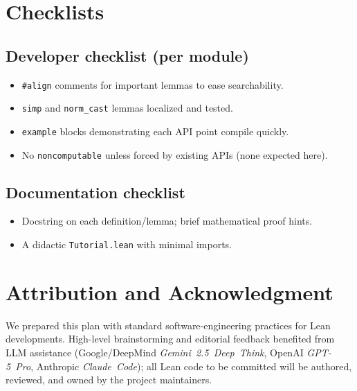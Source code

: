\documentclass[11pt]{article}
\begin{document}
\section{Checklists}\label{sec:checklists}

\subsection*{Developer checklist (per module)}
\begin{itemize}
  \item \texttt{\#align} comments for important lemmas to ease searchability.
  \item \texttt{simp} and \texttt{norm\_cast} lemmas localized and tested.
  \item \texttt{example} blocks demonstrating each API point compile quickly.
  \item No \texttt{noncomputable} unless forced by existing APIs (none expected here).
\end{itemize}

\subsection*{Documentation checklist}
\begin{itemize}
  \item Docstring on each definition/lemma; brief mathematical proof hints.
  \item A didactic \texttt{Tutorial.lean} with minimal imports.
\end{itemize}

\section*{Attribution and Acknowledgment}
We prepared this plan with standard software-engineering practices for Lean developments. High-level brainstorming and editorial feedback benefited from LLM assistance (Google/DeepMind \emph{Gemini~2.5~Deep~Think}, OpenAI \emph{GPT-5~Pro}, Anthropic \emph{Claude~Code}); all Lean code to be committed will be authored, reviewed, and owned by the project maintainers.

\end{document}
